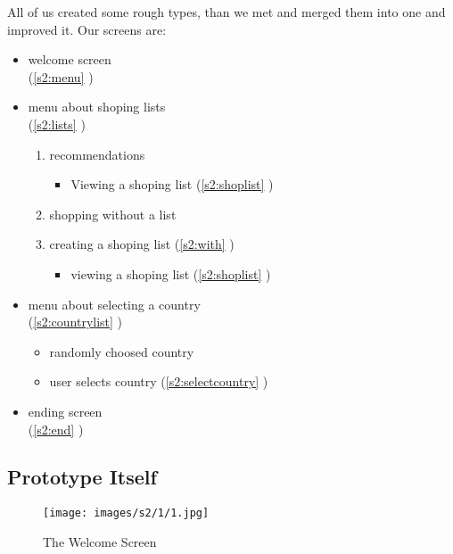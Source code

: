 All of us created some rough types, than we met and merged them into one and improved it. Our screens are:
\begin{itemize}
	\item welcome screen\\
	(\autoref{s2:menu} )
	
	\item menu about shoping lists\\
	(\autoref{s2:lists} )
	\begin{enumerate}
		\item recommendations
		\begin{itemize}
     		\item Viewing a shoping list
     		(\autoref{s2:shoplist} )
   		\end{itemize}
    	\item shopping without a list
    	\item creating a shoping list
    	(\autoref{s2:with} )
    	\begin{itemize}
     		\item viewing a shoping list
     		(\autoref{s2:shoplist} )
   		\end{itemize}
	\end{enumerate}
	
	\item menu about selecting a country\\
	(\autoref{s2:countrylist} )
	\begin{itemize}
     	\item randomly choosed country
     	\item user selects country
     	(\autoref{s2:selectcountry} )
   	\end{itemize}
   	
   	\item ending screen\\
   	(\autoref{s2:end} )
	
\end{itemize}

\clearpage
\subsection{Prototype Itself}

\begin{figure}[H]
	\centering
	\texttt{[image: images/s2/1/1.jpg]}
	\caption{ The Welcome Screen }
	\label{s2:menu}
\end{figure}

